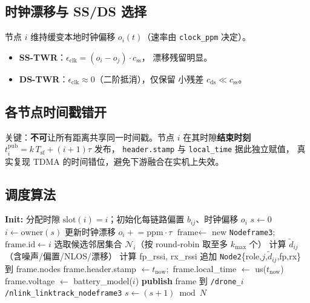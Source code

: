 \documentclass[11pt,a4paper]{article}
\begin{document}
\subsection{时钟漂移与 SS/DS 选择}
节点 $i$ 维持缓变本地时钟偏移 $o_i(t)$（速率由 \texttt{clock\_ppm} 决定）。
\begin{itemize}[leftmargin=1.4em]
  \item \textbf{SS-TWR}：$\epsilon_{\text{clk}}=(o_i-o_j)\cdot c_{\text{ss}}$，
        漂移残留明显。
  \item \textbf{DS-TWR}：$\epsilon_{\text{clk}}\approx 0$（二阶抵消），仅保留
        小残差 $c_{\text{ds}}\ll c_{\text{ss}}$。
\end{itemize}

\subsection{各节点时间戳错开}
关键：\textbf{不可}让所有距离共享同一时间戳。节点 $i$ 在其时隙\textbf{结束时刻}
$t_i^{\text{pub}} = k\,T_{\text{sf}} + (i+1)\tau$ 发布，
\texttt{header.stamp} 与 \texttt{local\_time} 据此独立赋值，
真实复现 TDMA 的时间错位，避免下游融合在实机上失效。

\subsection{调度算法}
\begin{algorithm}[H]
\caption{UWB TDMA 超帧调度（主定时器，周期 $=\tau$）}
\begin{algorithmic}[1]
\State \textbf{Init:} 分配时隙 $\text{slot}(i)=i$；初始化每链路偏置 $b_{ij}$、时钟偏移 $o_i$
\State $s \gets 0$ 
  \State $i \gets \text{owner}(s)$ 
  \State 更新时钟漂移 $o_i \mathrel{+}= \text{ppm}\cdot \tau$
  \State $\text{frame} \gets$ new \texttt{Nodeframe3}; $\text{frame.id}\gets i$
  \State 选取候选邻居集合 $\mathcal{N}_i$（按 round-robin 取至多 $k_{\max}$ 个）
           \State 计算 $\tilde{d}_{ij}$（含噪声/偏置/NLOS/漂移）
           \State 计算 fp\_rssi, rx\_rssi
           \State 追加 \texttt{Node2}\{role,$j$,$\tilde{d}_{ij}$,fp,rx\} 到 frame.nodes
        \EndIf
     \EndIf
  \EndFor
  \State frame.header.stamp $\gets t_{\text{now}}$;\ frame.local\_time $\gets$ us($t_{\text{now}}$)
  \State frame.voltage $\gets$ battery\_model($i$)
  \State \textbf{publish} frame 到 \texttt{/drone\_$i$/nlink\_linktrack\_nodeframe3}
  \State $s \gets (s+1) \bmod N$ 
\EndProcedure
\end{algorithmic}
\end{algorithm}
\end{document}
